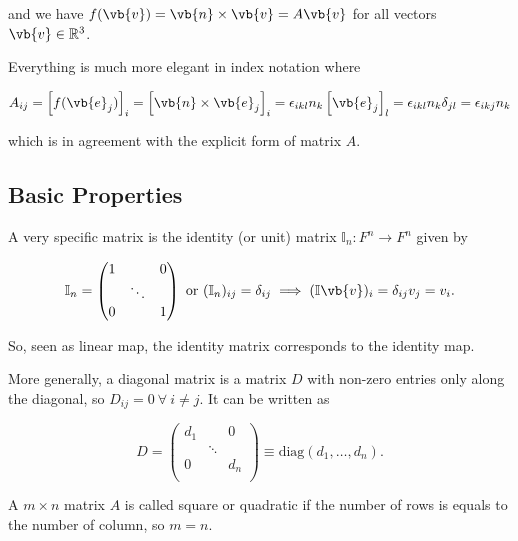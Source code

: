 \documentclass[a4paper,12pt]{report}
\begin{document}
{and we have \(f(\vb{v} ) = \vb{n} \times \vb{v} = A\vb{v} \) for all vectors \(\vb{v} \in \mathbb{R}^3 \). 

Everything is much more elegant in index notation where

\begin{equation}
    A_{ij} = \left[ f(\vb{e} _{j} ) \right]_{i} = \left[ \vb{n} \times \vb{e} _{j}  \right] _{i} = \epsilon _{ikl}n_{k}\left[ \vb{e} _{j}  \right]_{l} = \epsilon _{ikl}n_{k}\delta _{jl}= \epsilon _{ikj}n_{k}       
\end{equation}

which is in agreement with the explicit form of matrix \(A\).} 



\subsection{Basic Properties}

A very specific matrix is the identity (or unit) matrix \(\mathbb{I}_{n}: F^{n} \rightarrow  F^{n} \) given by 

\begin{equation}
    \mathbb{I}_{n} = \begin{pmatrix}
        1 &  &  0 \\
         & \ddots  &   \\
        0 &  & 1  \\
    \end{pmatrix} \text { or } (\mathbb{I}_{n} )_{ij} = \delta _{ij} \implies (\mathbb{I}\vb{v} )_{i} = \delta _{ij}v_{j} = v_{i}.
\end{equation}

So, seen as linear map, the identity matrix corresponds to the identity map.

More generally, a diagonal matrix is a matrix \(D\) with non-zero entries only along the diagonal, so \(D_{ij} = 0 ~\forall ~ i \neq j \). It can be written as 

\begin{equation}
    D = \begin{pmatrix}
        d_{1}   &  & 0  \\
         & \ddots  &   \\
        0 &  & d_{n}  \\
    \end{pmatrix} \equiv \text{diag}(d_{1} ,\ldots ,d_{n} ). 
\end{equation}

A \(m\times n\) matrix \(A\) is called square or quadratic if the number of rows is equals to the number of column, so \(m = n\). 
\end{document}

